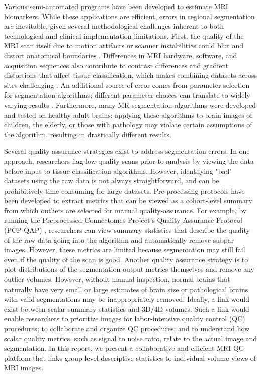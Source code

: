 Various semi-automated programs have been developed to estimate MRI biomarkers. While these applications are efficient, errors in regional segmentation are inevitable, given several methodological challenges inherent to both technological and clinical implementation limitations. First, the quality of the MRI scan itself due to motion artifacts or scanner instabilities could blur and distort anatomical boundaries \cite{Blumenthal_2002,Pardoe_2016,Reuter_2015,Savalia_2016}. Differences in MRI hardware, software, and acquisition sequences also contribute to contrast differences and gradient distortions that affect tissue classification, which makes combining datasets across sites challenging \cite{keshavan2016power}. An additional source of error comes from parameter selection for segmentation algorithms; different parameter choices can translate to widely varying results \cite{Han_2006}. Furthermore, many MR segmentation algorithms were developed and tested on healthy adult brains; applying these algorithms to brain images of children, the elderly, or those with pathology may violate certain assumptions of the algorithm, resulting in drastically different results. 

Several quality assurance strategies exist to address segmentation errors. In one approach, researchers flag low-quality scans prior to analysis by viewing the data before input to tissue classification algorithms.  However, identifying "bad" datasets using the raw data is not always straightforward, and can be prohibitively time consuming for large datasets. Pre-processing protocols have been developed to extract metrics that can be viewed as a cohort-level summary from which outliers are selected for manual quality-assurance. For example, by running the Preprocessed-Connectomes Project’s Quality Assurance Protocol (PCP-QAP) \cite{shehzadpreprocessed}, researchers can view summary statistics that describe the quality of the raw data going into the algorithm and automatically remove subpar images. However, these metrics are limited because segmentation may still fail even if the quality of the scan is good. Another quality assurance strategy is to plot distributions of the segmentation output metrics themselves and remove any outlier volumes. However, without manual inspection, normal brains that naturally have very small or large estimates of brain size or pathological brains with valid segmentations may be inappropriately removed. Ideally, a link would exist between scalar summary statistics and 3D/4D volumes. Such a link would enable researchers to prioritize  images for labor-intensive quality control (QC) procedures; to collaborate and organize QC procedures; and to understand how scalar quality metrics, such as signal to noise ratio, relate to the actual image and segmentation. In this report, we present a collaborative and efficient MRI QC platform that links group-level descriptive statistics to individual volume views of MRI images.  

